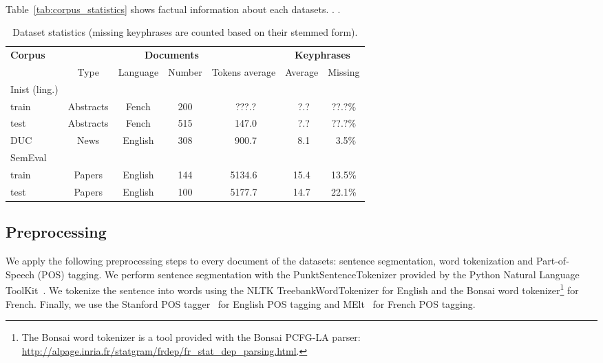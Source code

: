     \paragraph{}
    Table~\ref{tab:corpus_statistics} shows factual information about each
    datasets. . .
    \begin{table*}
      \centering
      \begin{tabular}{l|cccc|cc}
        \toprule
        \multirow{2}{*}{\textbf{Corpus}} & \multicolumn{4}{c|}{\textbf{Documents}} & \multicolumn{2}{c}{\textbf{Keyphrases}}\\
        \cline{2-7}
        & Type & Language & Number & Tokens average & Average & Missing\\
        \hline
        Inist (ling.) & & & & & &\\
        \hfill{}train & Abstracts & Fench & 200 & $~~$???.? & $~~$?.? & ??.?\%\\
        \hfill{}test & Abstracts & Fench & 515 & $~~$147.0 & $~~$?.? & ??.?\%\\
        \hline
        DUC & News & English & 308 & $~~$900.7 & $~~$8.1 & $~~$3.5\%\\
        \hline
        SemEval & & & & & &\\
        \hfill{}train & Papers & English & 144 & 5134.6 & 15.4 & 13.5\%\\
        \hfill{}test & Papers & English & 100 & 5177.7 & 14.7 & 22.1\%\\
        \bottomrule
      \end{tabular}
      \caption{Dataset statistics (missing keyphrases are counted based on
               their stemmed form). \label{tab:corpora}}
    \end{table*}

  \subsection{Preprocessing}
  \label{subsec:preprocessing}
    We apply the following preprocessing steps to every document of the
    datasets: sentence segmentation, word tokenization and Part-of-Speech (POS)
    tagging. We perform sentence segmentation with the PunktSentenceTokenizer
    provided by the Python Natural Language ToolKit~\cite[NLTK]{bird2009nltk}.
    We tokenize the sentence into words using the NLTK TreebankWordTokenizer for
    English and the Bonsai word tokenizer\footnote{The Bonsai word tokenizer is
    a tool provided with the Bonsai PCFG-LA parser:
    \url{http://alpage.inria.fr/statgram/frdep/fr_stat_dep_parsing.html}.} for
    French. Finally, we use the Stanford POS
    tagger~\cite{toutanova2003stanfordpostagger} for English POS tagging and
    MElt~\cite{denis2009melt} for French POS tagging.


